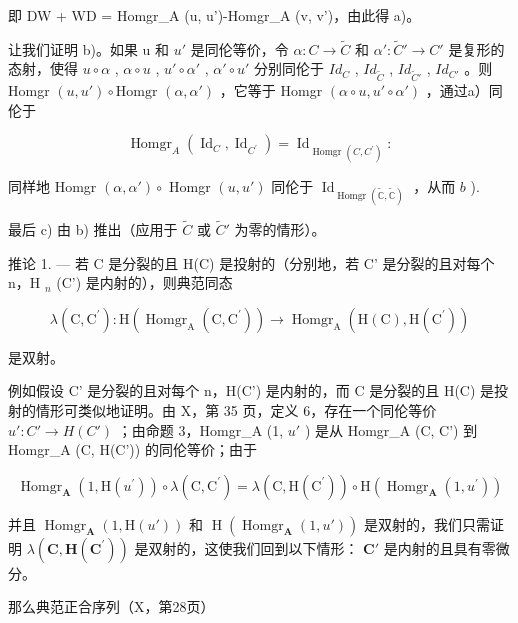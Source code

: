 即 DW + WD = Homgr\_A (u, u')-Homgr\_A (v, v')，由此得 a)。

让我们证明 b)。如果 u 和 \(u'\) 是同伦等价，令 \(\alpha: C \to \tilde{C}\) 和 \(\alpha': \tilde{C}' \to C'\) 是复形的态射，使得 \(u \circ \alpha\) , \(\alpha \circ u\) , \(u' \circ \alpha'\) , \(\alpha' \circ u'\) 分别同伦于 \(Id_{C}\) , \(Id_{\tilde{C}}\) , \(Id_{\tilde{C}'}\) , \(Id_{C'}\) 。则 Homgr \((u, u') \circ \text{Homgr } (\alpha, \alpha')\) ，它等于 Homgr \((\alpha \circ u, u' \circ \alpha')\) ，通过a）同伦于

\[
\operatorname{Homgr} _ {A} \left(\operatorname{Id} _ {C}, \operatorname{Id} _ {C ^ {\prime}}\right) = \operatorname{Id} _ {\operatorname{Homgr} (C, C ^ {\prime})}:
\]

同样地 Homgr \((\alpha, \alpha') \circ\) Homgr \((u, u')\) 同伦于 \(\operatorname{Id}_{\operatorname{Homgr}(\tilde{\mathbb{C}}, \tilde{\mathbb{C}})}\) ，从而 \(b\) ).

最后 c) 由 b) 推出（应用于 \(\tilde{C}\) 或 \(\tilde{C}'\) 为零的情形）。

推论 1. --- 若 C 是分裂的且 H(C) 是投射的（分别地，若 C' 是分裂的且对每个 n，H \(_{n}\) (C') 是内射的），则典范同态

\[
\lambda (\mathrm{C}, \mathrm{C} ^ {\prime}): \mathrm{H} (\operatorname{Homgr} _ {\mathrm{A}} (\mathrm{C}, \mathrm{C} ^ {\prime})) \rightarrow \operatorname{Homgr} _ {\mathrm{A}} (\mathrm{H} (\mathrm{C}), \mathrm{H} (\mathrm{C} ^ {\prime}))
\]

是双射。

例如假设 C' 是分裂的且对每个 n，H(C') 是内射的，而 C 是分裂的且 H(C) 是投射的情形可类似地证明。由 X，第 35 页，定义 6，存在一个同伦等价 \(u': C' \to H(C')\) ；由命题 3，Homgr\_A (1, \(u'\) ) 是从 Homgr\_A (C, C') 到 Homgr\_A (C, H(C')) 的同伦等价；由于

\[
\operatorname{Homgr} _ {\mathbf {A}} \left(1, \mathrm{H} \left(u ^ {\prime}\right)\right) \circ \lambda (\mathrm{C}, \mathrm{C} ^ {\prime}) = \lambda (\mathrm{C}, \mathrm{H} \left(\mathrm{C} ^ {\prime}\right)) \circ \mathrm{H} \left(\operatorname{Homgr} _ {\mathbf {A}} \left(1, u ^ {\prime}\right)\right)
\]

并且 \(\operatorname{Homgr}_{\mathbf{A}}(1, \mathrm{H}(u'))\) 和 \(\operatorname{H}(\operatorname{Homgr}_{\mathbf{A}}(1, u'))\) 是双射的，我们只需证明 \(\lambda(\mathbf{C},\mathbf{H}(\mathbf{C}^{\prime}))\) 是双射的，这使我们回到以下情形： \(\mathbf{C}'\) 是内射的且具有零微分。

那么典范正合序列（X，第28页）

